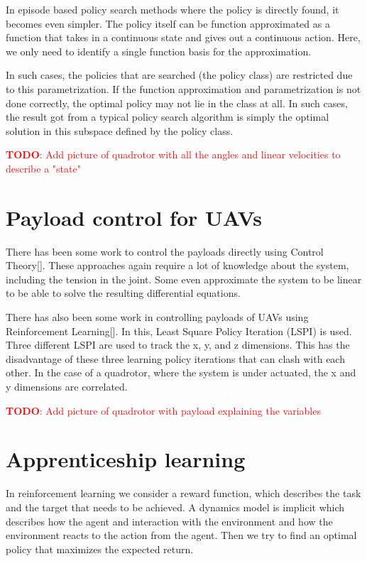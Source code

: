 \documentclass[BTech]{iitmdiss}
\newcommand\todo[1]{\textcolor{red}{{\bf TODO}: #1}}
\begin{document}
In episode based policy search methods where the policy is directly found, it becomes even simpler. The policy itself can be function approximated as a function that takes in a continuous state and gives out a continuous action. Here, we only need to identify a single function basis for the approximation.

In such cases, the policies that are searched (the policy class) are restricted due to this parametrization. If the function approximation and parametrization is not done correctly, the optimal policy may not lie in the class at all. In such cases, the result got from a typical policy search algorithm is simply the optimal solution in this subspace defined by the policy class.

\todo{Add picture of quadrotor with all the angles and linear velocities to describe a "state"}

\section{Payload control for UAVs}

There has been some work to control the payloads directly using Control Theory[]. These approaches again require a lot of knowledge about the system, including the tension in the joint. Some even approximate the system to be linear to be able to solve the resulting differential equations.

There has also been some work in controlling payloads of UAVs using Reinforcement Learning[]. In this, Least Square Policy Iteration (LSPI) is used. Three different LSPI are used to track the x, y, and z dimensions. This has the disadvantage of these three learning policy iterations that can clash with each other. In the case of a quadrotor, where the system is under actuated, the x and y dimensions are correlated.

\todo{Add picture of quadrotor with payload explaining the variables}

\section{Apprenticeship learning}

In reinforcement learning we consider a reward function, which describes the task and the target that needs to be achieved. A dynamics model is implicit which describes how the agent and interaction with the environment and how the environment reacts to the action from the agent. Then we try to find an optimal policy that maximizes the expected return.
\end{document}
